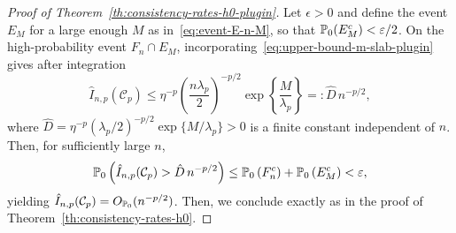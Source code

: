 \begin{proof}[Proof of Theorem~\ref{th:consistency-rates-h0-plugin}]
Let \(\epsilon>0\) and define the event \(E_{M}\) for a large enough \(M\) as in~\eqref{eq:event-E-n-M}, so that \(\mathbb{P}_0(E_M^c)<\varepsilon/2\). On the high-probability event \(F_n\cap E_{M}\), incorporating~\eqref{eq:upper-bound-m-slab-plugin} gives after integration
\[
\hat I_{n,p}(\mathcal C_p) \leq \eta^{-p}\left(\frac{n\lambda_p}{2}\right)^{-p/2}\exp\left\{\frac{M}{\lambda_p}\right\} =: \hat D\, n^{-p/2},
\]
where \(\hat D=\eta^{-p}(\lambda_p/2)^{-p/2}\exp\{M/\lambda_p\}>0\) is a finite constant independent of \(n\). Then, for sufficiently large \(n\),
\[
\mathbb{P}_0\left(\hat I_{n,p}(\mathcal C_p) > \hat D\, n^{-p/2}\right) \leq \mathbb{P}_0\left(F_n^c\right)+\mathbb{P}_0\left(E_{M}^c\right) < \varepsilon,
\]
yielding \(\hat I_{n,p}(\mathcal C_p)=O_{\mathbb{P}_0}(n^{-p/2})\). Then, we conclude exactly as in the proof of Theorem~\ref{th:consistency-rates-h0}.
\end{proof}

